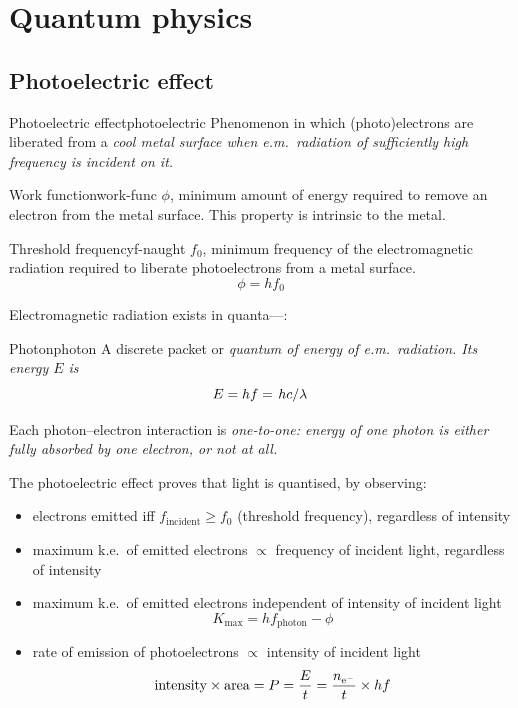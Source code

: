 \chapter{Quantum physics}
\section{Photoelectric effect}
\begin{definition}{Photoelectric effect}{photoelectric}
	Phenomenon in which (photo)electrons are liberated from a \it{cool metal surface}
	when \it{e.m.~radiation} of sufficiently high frequency is incident on it.
\end{definition}
\begin{definition}{Work function}{work-func}
	\(\phi\), minimum amount of energy required to remove an electron from the metal surface.
	\vspace*{.5em}
	\footnotesize This property is intrinsic to the metal.
\end{definition}
\begin{definition}{Threshold frequency}{f-naught}
	\(f_0\), minimum frequency of the electromagnetic radiation
	required to liberate photoelectrons from a metal surface.
	\[\phi = hf_0\]
\end{definition}

Electromagnetic radiation exists in quanta---:
\begin{definition}{Photon}{photon}
	A discrete packet or \it{quantum} of energy of e.m.~radiation. Its energy \(E\) is
	\[E = hf = \lf{hc}{\lambda}\]
\end{definition}

Each photon--electron interaction is \it{one-to-one}: energy of one photon
is either fully absorbed by one electron, or not at all.

The photoelectric effect proves that light is quantised, by observing:
\begin{itemize}
	\item electrons emitted iff \(f_\text{incident} \geq f_0\) (threshold frequency), regardless of intensity
	\item maximum k.e.~of emitted electrons \(\propto\) frequency of incident light, regardless of intensity
	\item maximum k.e.~of emitted electrons independent of intensity of incident light
	      \[K_{\max}= h f_{\text{photon}} - \phi\]
	\item rate of emission of photoelectrons \(\propto\) intensity of incident light
	      \[\text{intensity}\times\text{area} = P = \f{E}{t} = \f{n_{\ce{e-}}}{t}\times{hf}\]
\end{itemize}

